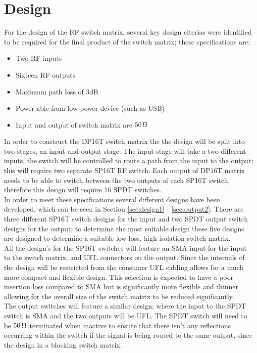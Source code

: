 \documentclass[12pt,openany,a4paper]{book}
\newcommand{\ohm}	{\ensuremath{\rm\,\Omega}}
\begin{document}
\section{Design}
For the design of the RF switch matrix, several key design citerias were identified to be required for the final product of the switch matrix; these specifications are:
\begin{itemize}
	\setlength\itemsep{-0.5em}
	\item Two RF inputs
	\item Sixteen RF outputs
	\item Maximum path loss of $3$dB
	\item Power-able from low-power device (such as USB)
	\item Input and output of switch matrix are $50\ohm$
\end{itemize}
In order to construct the DP16T switch matrix the the design will be split into two stages, an input and output stage. The input stage will take a two different inputs, the switch will be controlled to route a path from the input to the output; this will require two separate SP16T RF switch. Each output of DP16T matrix needs to be able to switch between the two outputs of each SP16T switch, therefore this design will require 16 SPDT switches. \\[0.2cm]
In order to meet these specifications several different designs have been developed, which can be seen in Section \ref{sec:design1} - \ref{sec:output2}. There are three different SP16T switch designs for the input and two SPDT output switch designs for the output; to determine the most suitable design these five designs are designed to determine a suitable low-loss, high isolation switch matrix. \\[0.2cm]
All the design's for the SP16T switches will feature an SMA input for the input to the switch matrix, and UFL connectors on the output. Since the internals of the design will be restricted from the consumer UFL cabling allows for a much more compact and flexible design. This selection is expected to have a poor insertion loss compared to SMA but is significantly more flexible and thinner allowing for the overall size of the switch matrix to be reduced significantly.\\
The output switches will feature a similar design; where the input to the SPDT switch is SMA and the two outputs will be UFL. The SPDT switch will need to be $50\ohm$ terminated when inactive to ensure that there isn't any reflections occurring within the switch if the signal is being routed to the same output, since the design in a blocking switch matrix.  
\end{document}
